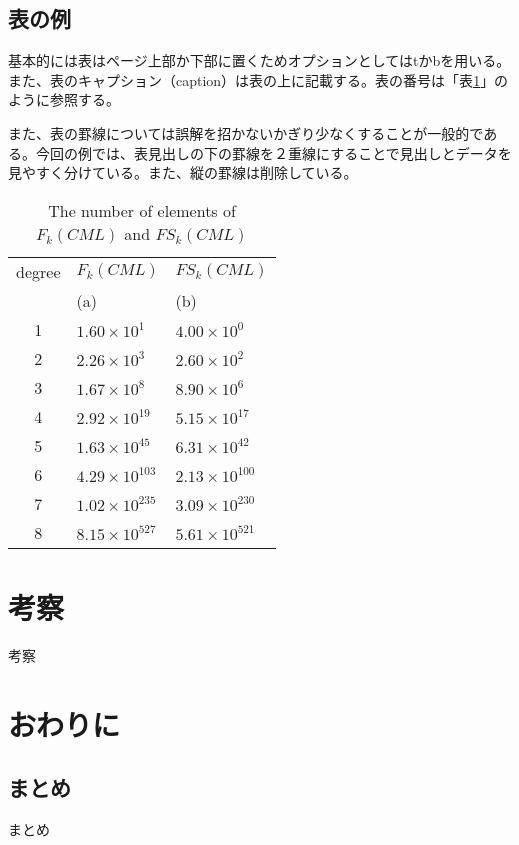 \documentclass[12pt,epsf]{jreport}
\begin{document}
 \section{表の例}
 
 基本的には表はページ上部か下部に置くためオプションとしてはtかbを用いる。また、表のキャプション（caption）は表の上に記載する。表の番号は「表\ref{tab:num_of_schemata_satisfied_srp}」のように参照する。

また、表の罫線については誤解を招かないかぎり少なくすることが一般的である。今回の例では、表見出しの下の罫線を２重線にすることで見出しとデータを見やすく分けている。また、縦の罫線は削除している。
 
 \begin{table}[tb]
\begin{center}
\caption{The number of elements of $F_{k}(CML)$ and $FS_{k}(CML)$}
\label{tab:num_of_schemata_satisfied_srp}
 \begin{tabular}{c l l}
  \hline
 degree & $F_{k}(CML)$ &$FS_{k}(CML)$ \\
    & (a)&  (b)\\ 
  \hline
  \hline
  1 &  $1.60 \times 10^{1}$ & $4.00 \times 10^{0}$\\
  2 & $2.26 \times 10^{3}$ & $2.60 \times 10^{2}$  \\
  3 & $1.67 \times 10^{8}$ & $8.90 \times 10^{6}$\\
  4 & $2.92 \times 10^{19}$ & $5.15 \times 10^{17}$\\
  5 & $1.63 \times 10^{45}$ & $6.31 \times 10^{42}$\\
  6 & $4.29 \times 10^{103}$ & $2.13 \times 10^{100}$\\
  7 & $1.02 \times 10^{235}$ & $3.09 \times 10^{230}$\\
  8 & $8.15 \times 10^{527}$ & $5.61 \times 10^{521}$\\ 
  \hline
 \end{tabular}
\end{center}
\end{table}




\chapter{考察}
考察

\chapter{おわりに}
 \section{まとめ}
 まとめ
\end{document}

